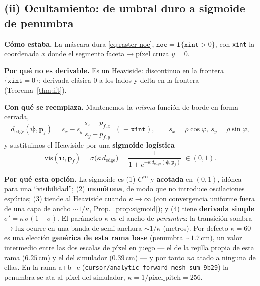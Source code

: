 \documentclass[11pt,a4paper]{article}
\theoremstyle{plain}
\theoremstyle{definition}
\newcommand{\vect}[1]{\boldsymbol{#1}}
\begin{document}
\subsection{(ii) Ocultamiento: de umbral duro a sigmoide de penumbra}
\label{sec:vis}

\textbf{C\'omo estaba.} La m\'ascara dura \eqref{eq:raster-noc},
$\texttt{noc}=\mathbf 1\{\texttt{xint}>0\}$, con \texttt{xint} la coordenada $x$
donde el segmento faceta$\to$p\'ixel cruza $y=0$.

\textbf{Por qu\'e no es derivable.} Es un Heaviside: discontinuo en la frontera
$\{\texttt{xint}=0\}$; derivada cl\'asica $0$ a los lados y delta en la frontera
(Teorema~\ref{thm:ift}).

\textbf{Con qu\'e se reemplaza.} Mantenemos la \emph{misma} funci\'on de borde en
forma cerrada,
\begin{equation}
    d_{\mathrm{edge}}(\vect{\psi},\vect{p}_f)
    =s_x - s_y\,\frac{s_x-p_{f,x}}{s_y-p_{f,y}}
    \;\;(\equiv\texttt{xint}),
    \qquad s_x=\rho\cos\varphi,\ s_y=\rho\sin\varphi,
    \label{eq:dedge}
\end{equation}
y sustituimos el Heaviside por una \textbf{sigmoide log\'istica}
\begin{equation}
    \boxed{\;
    \mathrm{vis}(\vect{\psi},\vect{p}_f)
    =\sigma\!\bigl(\kappa\,d_{\mathrm{edge}}\bigr)
    =\frac{1}{1+e^{-\kappa\, d_{\mathrm{edge}}(\vect{\psi},\vect{p}_f)}}
    \;\in(0,1).
    \;}
    \label{eq:sigmoid}
\end{equation}

\textbf{Por qu\'e esta opci\'on.} La sigmoide es (1) $C^\infty$ y \textbf{acotada}
en $(0,1)$, id\'onea para una ``visibilidad''; (2) \textbf{mon\'otona}, de modo que
no introduce oscilaciones esp\'urias; (3) tiende al Heaviside cuando
$\kappa\to\infty$ (con convergencia uniforme fuera de una capa de ancho
$\sim1/\kappa$, Prop.~\ref{prop:sigmoid}); y (4) tiene \textbf{derivada simple}
$\sigma'=\kappa\,\sigma(1-\sigma)$. El par\'ametro $\kappa$ es el ancho de
\emph{penumbra}: la transici\'on sombra$\to$luz ocurre en una banda de
semi-anchura $\sim1/\kappa$ (metros). Por defecto $\kappa=60$ es una elecci\'on
\textbf{gen\'erica de esta rama base} (penumbra $\sim1.7$\,cm), un valor
intermedio entre las dos escalas de p\'ixel en juego --- el de la rejilla propia
de esta rama ($6.25$\,cm) y el del simulador ($0.39$\,cm) --- y por tanto
\emph{no} atado a ninguna de ellas. En la rama a+b+c
(\texttt{cursor/analytic-forward-mesh-sum-9b29}) la penumbra se ata al p\'ixel del
simulador, $\kappa=1/\text{pixel\_pitch}=256$.
\end{document}
